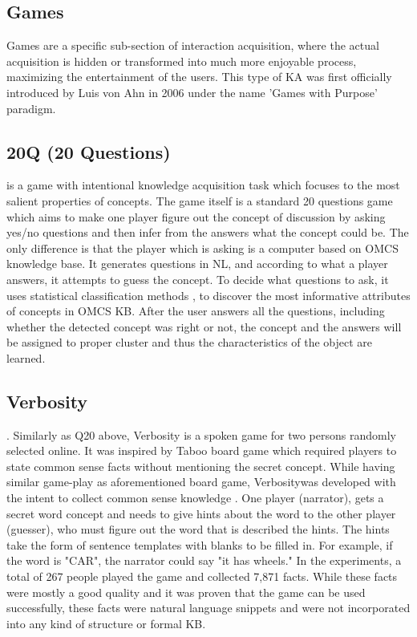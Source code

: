 \subsection{Games}
Games are a specific sub-section of interaction acquisition, where the actual
acquisition is hidden or transformed into much more enjoyable process, 
maximizing the entertainment of the users. This type of KA was first 
officially introduced by Luis von Ahn in 2006 \parencite{VonAhn2006,
VonAhn2008} under the name 'Games with Purpose' paradigm.

\subsection{20Q (20 Questions)} is a game with intentional knowledge acquisition task
which focuses to the most salient properties of concepts. The game itself is
a standard 20 questions game which aims to make one player figure out the 
concept of discussion by asking yes/no questions and then infer from the 
answers what the concept could be. The only difference is that the player which
is asking is a computer based on OMCS knowledge base. It generates questions in
NL, and according to what a player answers, it attempts to guess the concept.
To decide what questions to ask, it uses statistical classification methods
\parencite{Speer2009}, to discover the most informative attributes of concepts
in OMCS KB. After the user answers all the questions, including whether the
detected concept was right or not, the concept and the answers will be assigned
to proper cluster and thus the characteristics of the object are learned.

\subsection{Verbosity}. Similarly as Q20 above, Verbosity is a spoken game for two 
persons randomly selected online. It was inspired by Taboo board 
game\parencite{TabooGame} which required players to state common sense facts
without mentioning the secret concept. While having similar game-play as 
aforementioned board game, Verbositywas developed with the intent to collect
common sense knowledge \parencite{VonAhn2006a}. One player (narrator), gets
a secret word concept and needs to give hints about the word to the other 
player (guesser), who must figure out the word that is described the hints.
The hints take the form of sentence templates with blanks to be filled in. 
For example, if the word is "CAR", the narrator could say "it has wheels."
In the experiments, a total of 267 people played the game and collected
7,871 facts. While these facts were mostly a good quality and it was proven
that the game can be used successfully, these facts were natural language 
snippets and were not incorporated into any kind of structure or formal KB. 

